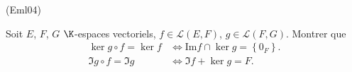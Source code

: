 \begin{tiny}(Eml04)\end{tiny}
Soit $E$, $F$, $G$ $\K$-espaces vectoriels, $f\in \mathcal{L}(E,F)$, $g\in \mathcal{L}(F,G)$. Montrer que
\begin{align*}
\ker g\circ f = \ker f &\Leftrightarrow  \mathrm{Im}f \cap \ker g = \left\{0_{F}\right\}. \\
\Im g\circ f = \Im g &\Leftrightarrow  \Im f + \ker g = F.
\end{align*}
